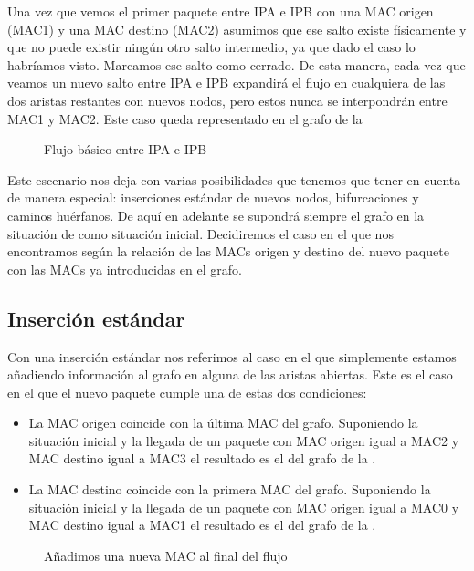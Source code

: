 \documentclass[twoside, 12pt]{epstfg}
\begin{document}
Una vez que vemos el primer paquete entre IPA e IPB con una MAC origen (MAC1) y una MAC destino (MAC2) asumimos que ese salto existe físicamente y que no puede existir ningún otro salto intermedio, ya que dado el caso lo habríamos visto. Marcamos ese salto como cerrado. De esta manera, cada vez que veamos un nuevo salto entre IPA e IPB expandirá el flujo en cualquiera de las dos aristas restantes con nuevos nodos, pero estos nunca se interpondrán entre MAC1 y MAC2. Este caso queda representado en el grafo de la 

\begin{figure}
\centering

\caption[Flujo básico entre dos IPs]{Flujo básico entre IPA e IPB}
\label{fig:Analisis:BasicFlow}
\end{figure}

Este escenario nos deja con varias posibilidades que tenemos que tener en cuenta de manera especial: inserciones estándar de nuevos nodos, bifurcaciones y caminos huérfanos. De aquí en adelante se supondrá siempre el grafo en la situación de  como situación inicial. Decidiremos el caso en el que nos encontramos según la relación de las MACs origen y destino del nuevo paquete con las MACs ya introducidas en el grafo.

\subsection{Inserción estándar}
Con una inserción estándar nos referimos al caso en el que simplemente estamos añadiendo información al grafo en alguna de las aristas abiertas. Este es el caso en el que el nuevo paquete cumple una de estas dos condiciones:
\begin{itemize}
    \item La MAC origen coincide con la última MAC del grafo. Suponiendo la situación inicial y la llegada de un paquete con MAC origen igual a MAC2 y MAC destino igual a MAC3 el resultado es el del grafo de la .
    \item La MAC destino coincide con la primera MAC del grafo. Suponiendo la situación inicial y la llegada de un paquete con MAC origen igual a MAC0 y MAC destino igual a MAC1 el resultado es el del grafo de la .
\end{itemize}

\begin{figure}
\centering

\caption[Resultado de añadir MAC3 al final del flujo]{Añadimos una nueva MAC al final del flujo}
\label{fig:Analisis:AddingLast}
\end{figure}
\end{document}
